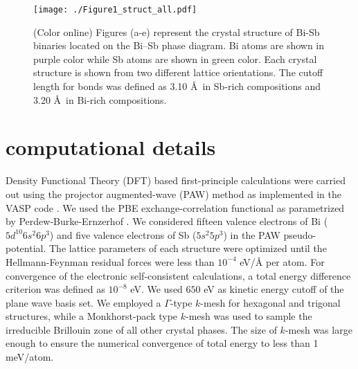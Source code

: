 \documentclass[twocolumn,superscriptaddress,nofootinbib,floatfix,aps,showpacs,prb,citeautoscript,reprint]{revtex4-1}
\begin{document}
\begin{figure}[htb!]
 \centering
 \texttt{[image: ./Figure1\_struct\_all.pdf]}
 \caption{(Color online) Figures (a-e) represent the crystal structure of Bi-Sb binaries located on the Bi--Sb phase diagram\cite{singh2016PCCP}. Bi atoms are shown in purple color while Sb atoms are shown in green color. Each crystal structure is shown from two different lattice orientations. The cutoff length for bonds was defined as 3.10 \AA~in Sb-rich compositions and 3.20 \AA~in Bi-rich compositions. 
 \label{fig:crystal}}
 \end{figure}


\section{computational details}
Density Functional Theory (DFT) based first-principle calculations were carried out using the projector augmented-wave (PAW) method as implemented in the {\sc VASP} code \cite{Kresse1996, Kresse1999}. We used the PBE exchange-correlation functional as parametrized by Perdew-Burke-Ernzerhof \cite{Perdew1996}. We considered fifteen valence electrons of Bi ($5d^{10}6s^{2}6p^{3}$) and five valence electrons of Sb ($5s^{2}5p^{3}$) in the PAW pseudo-potential. The lattice parameters of each structure were optimized until the Hellmann-Feynman residual forces were less than $10^{-4}$ eV/{\AA} per atom. For convergence of the electronic self-consistent calculations, a total energy difference criterion was defined as $10^{-8}$ eV. We used $650$ eV as kinetic energy cutoff of the plane wave basis set. We employed a $\Gamma$-type $k$-mesh for hexagonal and trigonal structures, while a Monkhorst-pack type $k$-mesh was used to sample the irreducible Brillouin zone of all other crystal phases. The size of $k$-mesh was large enough to ensure the numerical convergence of total energy to less than 1 meV/atom. 
\end{document}
